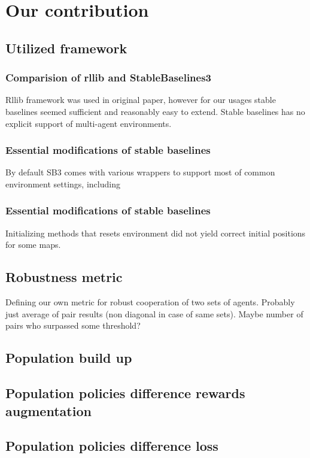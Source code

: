 \chapter{Our contribution}

\section{Utilized framework}
\subsection*{Comparision of rllib and StableBaselines3}
Rllib framework was used in original paper, however for our usages stable baselines seemed sufficient and reasonably easy to extend.
Stable baselines has no explicit support of multi-agent environments.
\subsection*{Essential modifications of stable baselines}
By default SB3 comes with various wrappers to support most of common environment settings, including 

\subsection*{Essential modifications of stable baselines}
Initializing methods that resets environment did not yield correct initial positions for some maps.

\section{Robustness metric}
Defining our own metric for robust cooperation of two sets of agents. Probably just average of pair results (non diagonal in case of same sets).
Maybe number of pairs who surpassed some threshold?

\section{Population build up}

\section{Population policies difference rewards augmentation}

\section{Population policies difference loss}

